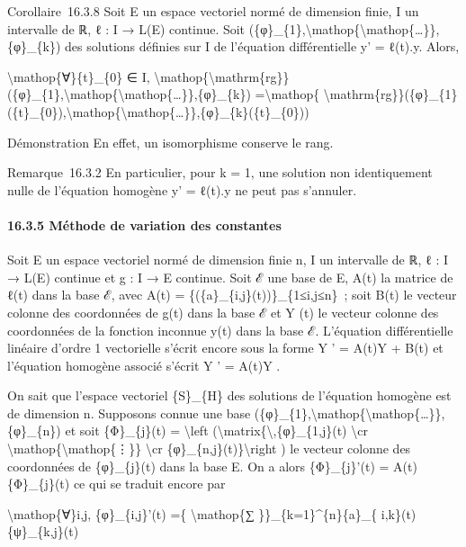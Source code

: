 \documentclass[]{article}
\begin{document}
Corollaire~16.3.8 Soit E un espace vectoriel normé de dimension finie, I
un intervalle de ℝ, ℓ : I → L(E) continue. Soit
(\{φ\}\_\{1\},\textbackslash{}mathop\{\textbackslash{}mathop\{\ldots{}\}\},\{φ\}\_\{k\})
des solutions définies sur I de l'équation différentielle y' = ℓ(t).y.
Alors,

\textbackslash{}mathop\{∀\}\{t\}\_\{0\} ∈ I,
\textbackslash{}mathop\{\textbackslash{}mathrm\{rg\}\}(\{φ\}\_\{1\},\textbackslash{}mathop\{\textbackslash{}mathop\{\ldots{}\}\},\{φ\}\_\{k\})
=\textbackslash{}mathop\{
\textbackslash{}mathrm\{rg\}\}(\{φ\}\_\{1\}(\{t\}\_\{0\}),\textbackslash{}mathop\{\textbackslash{}mathop\{\ldots{}\}\},\{φ\}\_\{k\}(\{t\}\_\{0\}))

Démonstration En effet, un isomorphisme conserve le rang.

Remarque~16.3.2 En particulier, pour k = 1, une solution non
identiquement nulle de l'équation homogène y' = ℓ(t).y ne peut pas
s'annuler.

\paragraph{16.3.5 Méthode de variation des constantes}

Soit E un espace vectoriel normé de dimension finie n, I un intervalle
de ℝ, ℓ : I → L(E) continue et g : I → E continue. Soit ℰ une base de E,
A(t) la matrice de ℓ(t) dans la base ℰ, avec A(t) =
\{(\{a\}\_\{i,j\}(t))\}\_\{1≤i,j≤n\}~; soit B(t) le vecteur colonne des
coordonnées de g(t) dans la base ℰ et Y (t) le vecteur colonne des
coordonnées de la fonction inconnue y(t) dans la base ℰ. L'équation
différentielle linéaire d'ordre 1 vectorielle s'écrit encore sous la
forme Y ' = A(t)Y + B(t) et l'équation homogène associé s'écrit Y ' =
A(t)Y .

On sait que l'espace vectoriel \{S\}\_\{H\} des solutions de l'équation
homogène est de dimension n. Supposons connue une base
(\{φ\}\_\{1\},\textbackslash{}mathop\{\textbackslash{}mathop\{\ldots{}\}\},\{φ\}\_\{n\})
et soit \{Φ\}\_\{j\}(t) = \textbackslash{}left
(\textbackslash{}matrix\{\textbackslash{},\{φ\}\_\{1,j\}(t)
\textbackslash{}cr \textbackslash{}mathop\{\textbackslash{}mathop\{⋮\}\}
\textbackslash{}cr \{φ\}\_\{n,j\}(t)\}\textbackslash{}right ) le vecteur
colonne des coordonnées de \{φ\}\_\{j\}(t) dans la base E. On a alors
\{Φ\}\_\{j\}'(t) = A(t)\{Φ\}\_\{j\}(t) ce qui se traduit encore par

\textbackslash{}mathop\{∀\}i,j, \{φ\}\_\{i,j\}'(t) =\{
\textbackslash{}mathop\{∑ \}\}\_\{k=1\}\^{}\{n\}\{a\}\_\{
i,k\}(t)\{ψ\}\_\{k,j\}(t)
\end{document}
